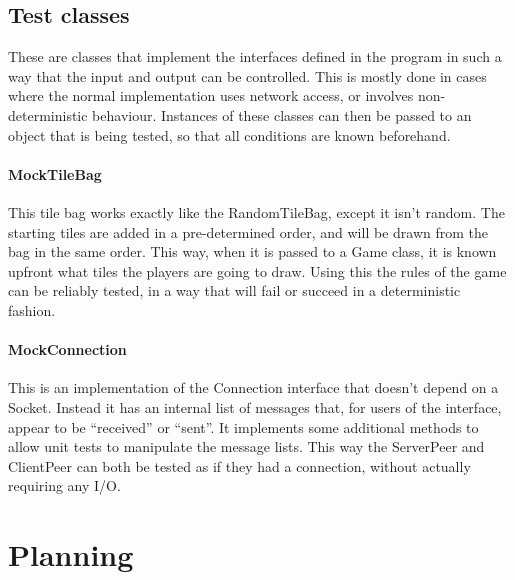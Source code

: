 \documentclass[12pt, letterpaper]{article}
\begin{document}


    \subsection{Test classes}
    \label{subsec:testClasses}

    These are classes that implement the interfaces defined in the program in such a way that the input and output can
    be controlled.
    This is mostly done in cases where the normal implementation uses network access, or involves non-deterministic
    behaviour.
    Instances of these classes can then be passed to an object that is being tested, so that all conditions are known
    beforehand.

    \paragraph{MockTileBag}
    This tile bag works exactly like the RandomTileBag, except it isn't random.
    The starting tiles are added in a pre-determined order, and will be drawn from the bag in the same order.
    This way, when it is passed to a Game class, it is known upfront what tiles the players are going to draw.
    Using this the rules of the game can be reliably tested, in a way that will fail or succeed in a deterministic
    fashion.

    \paragraph{MockConnection}
    This is an implementation of the Connection interface that doesn't depend on a Socket.
    Instead it has an internal list of messages that, for users of the interface, appear to be ``received'' or ``sent''.
    It implements some additional methods to allow unit tests to manipulate the message lists.
    This way the ServerPeer and ClientPeer can both be tested as if they had a connection, without actually requiring
    any I/O.


    \section{Planning}
    \label{sec:planning}
\end{document}

